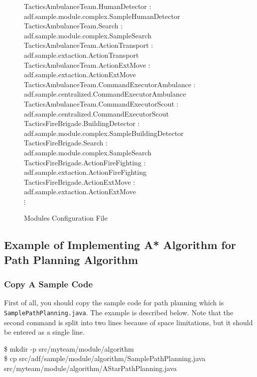 \documentclass{article}
\begin{document}
\begin{figure}[ht]
 \begin{center}
  \begin{screen}
   {\ttfamily\small
TacticsAmbulanceTeam.HumanDetector : adf.sample.module.complex.SampleHumanDetector\\
TacticsAmbulanceTeam.Search : adf.sample.module.complex.SampleSearch\\

TacticsAmbulanceTeam.ActionTransport : adf.sample.extaction.ActionTransport\\
TacticsAmbulanceTeam.ActionExtMove : adf.sample.extaction.ActionExtMove\\

TacticsAmbulanceTeam.CommandExecutorAmbulance : adf.sample.centralized.CommandExecutorAmbulance\\
TacticsAmbulanceTeam.CommandExecutorScout : adf.sample.centralized.CommandExecutorScout\\

TacticsFireBrigade.BuildingDetector : adf.sample.module.complex.SampleBuildingDetector\\
TacticsFireBrigade.Search : adf.sample.module.complex.SampleSearch\\

TacticsFireBrigade.ActionFireFighting : adf.sample.extaction.ActionFireFighting\\
TacticsFireBrigade.ActionExtMove : adf.sample.extaction.ActionExtMove\\
$\vdots$
}
  \end{screen}
  \caption{Modules Configuration File}
  \label{fig:module.cfg}
 \end{center}
\end{figure}
\subsection{Example of Implementing A* Algorithm for Path Planning Algorithm}
\subsubsection{Copy A Sample Code}
First of all, you should copy the sample code for path planning which is \texttt{SamplePathPlanning.java}. The example is described below. Note that the second command is split into two lines because of space limitations, but it should be entered as a single line.
\begin{center}
   \begin{tcolorbox}[title=Copy the Sample Path Planning, width=.98\linewidth]
    {\ttfamily
    \$ mkdir -p src/myteam/module/algorithm\\
    \$ cp src/adf/sample/module/algorithm/SamplePathPlanning.java src/myteam/module/algorithm/AStarPathPlanning.java
    }
  \end{tcolorbox}
\end{center}
\end{document}
